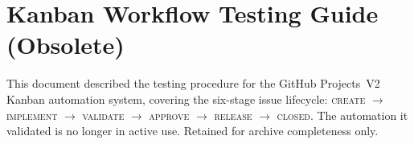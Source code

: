 
\section*{Kanban Workflow Testing Guide (Obsolete)}

This document described the testing procedure for the GitHub Projects~V2 Kanban
automation system, covering the six-stage issue lifecycle:
\textsc{create} $\to$ \textsc{implement} $\to$ \textsc{validate} $\to$
\textsc{approve} $\to$ \textsc{release} $\to$ \textsc{closed}.
The automation it validated is no longer in active use. Retained for
archive completeness only.
